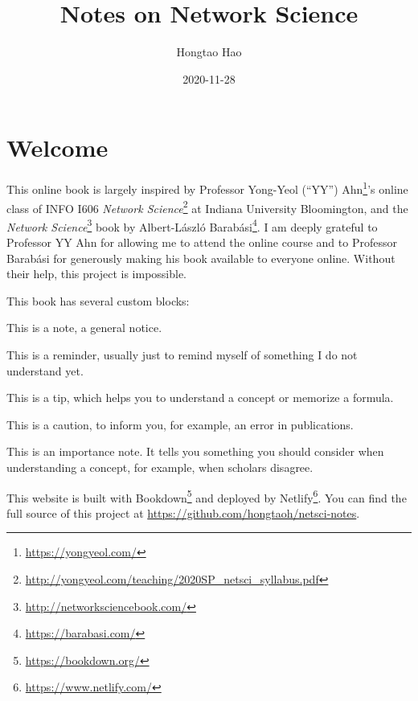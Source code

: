 \documentclass[
]{krantz}
\title{Notes on Network Science}
\author{Hongtao Hao}
\date{2020-11-28}
\makeatletter
\renewcommand{\href}[2]{#2\footnote{\url{#1}}}
\newenvironment{kframe}{%
\medskip{}
\setlength{\fboxsep}{.8em}
 \def\at@end@of@kframe{}%
 \ifinner\ifhmode%
  \def\at@end@of@kframe{\end{minipage}}%
  \begin{minipage}{\columnwidth}%
 \fi\fi%
 \def\FrameCommand##1{\hskip\@totalleftmargin \hskip-\fboxsep
 \colorbox{shadecolor}{##1}\hskip-\fboxsep
     \hskip-\linewidth \hskip-\@totalleftmargin \hskip\columnwidth}%
 \MakeFramed {\advance\hsize-\width
   \@totalleftmargin\z@ \linewidth\hsize
   \@setminipage}}%
 {\par\unskip\endMakeFramed%
 \at@end@of@kframe}
\newenvironment{rmdblock}[1]
  {
  \begin{itemize}
  \renewcommand{\labelitemi}{
    \raisebox{-.7\height}[0pt][0pt]{
      {\setkeys{Gin}{width=3em,keepaspectratio}\texttt{[image: images/\#1]}}
    }
  }
  \setlength{\fboxsep}{1em}
  \begin{kframe}
  \item
  }
  {
  \end{kframe}
  \end{itemize}
  }
\newenvironment{rmdnote}
  {\begin{rmdblock}{note}}
  {\end{rmdblock}}
\newenvironment{rmdcaution}
  {\begin{rmdblock}{caution}}
  {\end{rmdblock}}
\newenvironment{rmdimportant}
  {\begin{rmdblock}{important}}
  {\end{rmdblock}}
\newenvironment{rmdtip}
  {\begin{rmdblock}{tip}}
  {\end{rmdblock}}
\newenvironment{rmdreminder}
  {\begin{rmdblock}{reminder}}
  {\end{rmdblock}}
\makeatother
\begin{document}
\maketitle

{
\hypersetup{linkcolor=}
\setcounter{tocdepth}{2}
\tableofcontents
}
\listoftables
\listoffigures
\hypertarget{welcome}{%
\chapter*{Welcome}\label{welcome}}


This online book is largely inspired by Professor \href{https://yongyeol.com/}{Yong-Yeol (``YY'') Ahn}'s online class of \href{http://yongyeol.com/teaching/2020SP_netsci_syllabus.pdf}{INFO I606 \emph{Network Science}} at Indiana University Bloomington, and the \href{http://networksciencebook.com/}{\emph{Network Science}} book by \href{https://barabasi.com/}{Albert-László Barabási}. I am deeply grateful to Professor YY Ahn for allowing me to attend the online course and to Professor Barabási for generously making his book available to everyone online. Without their help, this project is impossible.

This book has several custom blocks:

\begin{rmdnote}
This is a note, a general notice.
\end{rmdnote}

\begin{rmdreminder}
This is a reminder, usually just to remind myself of something I do not understand yet.
\end{rmdreminder}

\begin{rmdtip}
This is a tip, which helps you to understand a concept or memorize a formula.
\end{rmdtip}

\begin{rmdcaution}
This is a caution, to inform you, for example, an error in publications.
\end{rmdcaution}

\begin{rmdimportant}
This is an importance note. It tells you something you should consider when understanding a concept, for example, when scholars disagree.
\end{rmdimportant}

This website is built with \href{https://bookdown.org/}{Bookdown} and deployed by \href{https://www.netlify.com/}{Netlify}. You can find the full source of this project at \url{https://github.com/hongtaoh/netsci-notes}.
\end{document}
